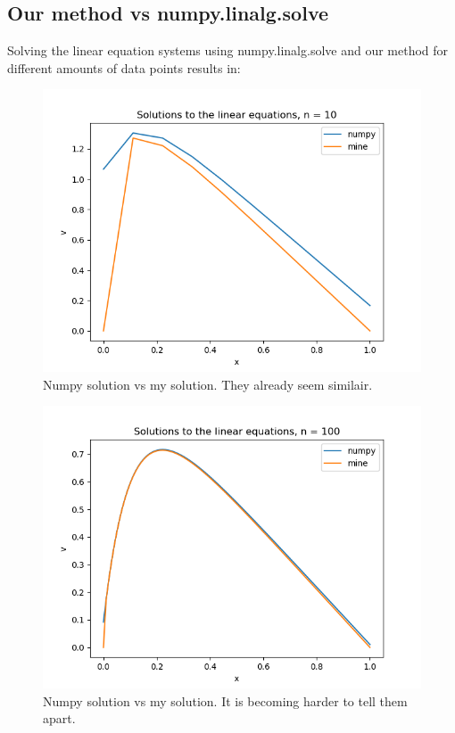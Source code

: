 \documentclass[a4paper,12pt,norsk]{article}
\begin{document}
	\subsection{Our method vs numpy.linalg.solve}
	Solving the linear equation systems using numpy.linalg.solve and our method for different amounts of data points results in:
	\begin{figure}[H]
		\includegraphics[scale = 0.7]{Figures/Figure_4.png}
		\centering
		\caption{Numpy solution vs my solution. They already seem similair.}
	\end{figure}
	
	\begin{figure}[H]
		\includegraphics[scale = 0.7]{Figures/Figure_5.png}
		\centering
		\caption{Numpy solution vs my solution. It is becoming harder to tell them apart.}
	\end{figure}
\end{document}
